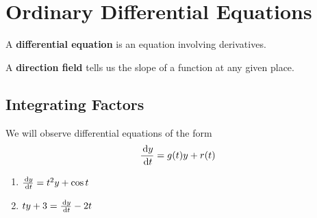 \chapter{Ordinary Differential Equations}
\begin{defn}
  A \textbf{differential equation} is an equation involving derivatives.
\end{defn}
\begin{defn}
  A \textbf{direction field} tells us the slope of a function at any given place.
\end{defn}
\section{Integrating Factors}
We will observe differential equations of the form
\begin{equation}
  \frac{\,\mathrm{d} y}{\,\mathrm{d} t} = g(t) y + r(t)
\end{equation}
\begin{enumerate}
  \item $\frac{\,\mathrm{d} y}{\,\mathrm{d} t} = t^2 y + \cos{t}$
  \item $t y +3=\frac{\,\mathrm{d} y}{\,\mathrm{d} t}-2t$
\end{enumerate}
